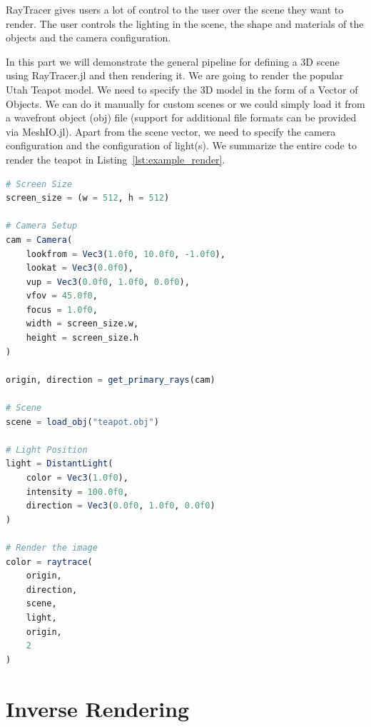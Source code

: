 \documentclass{juliacon}
\begin{document}
RayTracer gives users a lot of control to the user over the scene they want to render. The user controls the lighting in the scene, the shape and materials of the objects and the camera configuration.

In this part we will demonstrate the general pipeline for defining a 3D scene using RayTracer.jl and then rendering it. We are going to render the popular Utah Teapot model. We need to specify the 3D model in the form of a Vector of Objects. We can do it manually for custom scenes or we could simply load it from a wavefront object (obj) file (support for additional file formats can be provided via MeshIO.jl). Apart from the scene vector, we need to specify the camera configuration and the configuration of light(s). We summarize the entire code to render the teapot in Listing~\ref{lst:example_render}. 

\begin{lstlisting}[caption = {Rendering the Utah Teapot Model},
                   label = {lst:example_render},
                   captionpos = b,
                   language = Julia]
# Screen Size
screen_size = (w = 512, h = 512)
    
# Camera Setup
cam = Camera(
    lookfrom = Vec3(1.0f0, 10.0f0, -1.0f0),
    lookat = Vec3(0.0f0),
    vup = Vec3(0.0f0, 1.0f0, 0.0f0),
    vfov = 45.0f0,
    focus = 1.0f0,
    width = screen_size.w,
    height = screen_size.h
)
                 
origin, direction = get_primary_rays(cam)
    
# Scene
scene = load_obj("teapot.obj")
    
# Light Position
light = DistantLight(
    color = Vec3(1.0f0),
    intensity = 100.0f0,
    direction = Vec3(0.0f0, 1.0f0, 0.0f0)
)
                         
# Render the image
color = raytrace(
    origin,
    direction,
    scene,
    light,
    origin,
    2
)
\end{lstlisting}

\section{Inverse Rendering}
\end{document}
